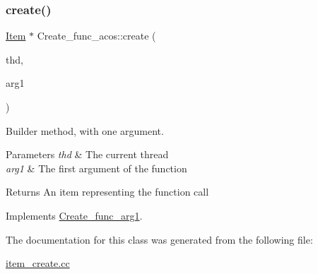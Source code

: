 \subsubsection{\texorpdfstring{create()}{create()}}
{\footnotesize\ttfamily \mbox{\hyperlink{classItem}{Item}} $\ast$ Create\+\_\+func\+\_\+acos\+::create (\begin{DoxyParamCaption}\item[{T\+HD $\ast$}]{thd,  }\item[{\mbox{\hyperlink{classItem}{Item}} $\ast$}]{arg1 }\end{DoxyParamCaption})\hspace{0.3cm}{\ttfamily [virtual]}}

Builder method, with one argument. 
\begin{DoxyParams}{Parameters}
{\em thd} & The current thread \\
\hline
{\em arg1} & The first argument of the function \\
\hline
\end{DoxyParams}
\begin{DoxyReturn}{Returns}
An item representing the function call 
\end{DoxyReturn}


Implements \mbox{\hyperlink{classCreate__func__arg1_a3e9a98f755cd82c3e762e334c955a8c9}{Create\+\_\+func\+\_\+arg1}}.



The documentation for this class was generated from the following file\+:\begin{DoxyCompactItemize}
\item 
\mbox{\hyperlink{item__create_8cc}{item\+\_\+create.\+cc}}\end{DoxyCompactItemize}

